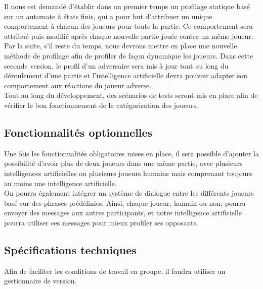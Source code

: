 \documentclass{report}
\begin{document}
Il nous est demandé d'établir dans un premier temps un profilage statique basé sur un automate à états finis, qui a pour but d'attribuer un unique comportement à chacun des joueurs pour toute la partie. Ce comportement sera attribué puis modifié après chaque nouvelle partie jouée contre un même joueur.\\

Par la suite, s'il reste du temps, nous devrons mettre en place une nouvelle méthode de profilage afin de profiler de façon dynamique les joueurs. Dans cette seconde version, le profil d'un adversaire sera mis à jour tout au long du déroulement d'une partie et l'intelligence artificielle devra pouvoir adapter son comportement aux réactions du joueur adverse.\\

Tout au long du développement, des scénarios de tests seront mis en place afin de vérifier le bon fonctionnement de la catégorisation des joueurs.\par

\subsection{Fonctionnalités optionnelles}

\hspace{0.5cm}Une fois les fonctionnalités obligatoires mises en place, il sera possible d'ajouter la possibilité d'avoir plus de deux joueurs dans une même partie, avec plusieurs intelligences artificielles ou plusieurs joueurs humains mais comprenant toujours au moins une intelligence artificielle.\\

On pourra également intégrer un système de dialogue entre les différents joueurs basé sur des phrases prédéfinies. Ainsi, chaque joueur, humain ou non, pourra envoyer des messages aux autres participants, et notre intelligence artificielle pourra utiliser ces messages pour mieux profiler ses opposants.\par 

\subsection{Spécifications techniques}

\hspace{0.5cm}Afin de faciliter les conditions de travail en groupe, il faudra utiliser un gestionnaire de version.\\
\end{document}
